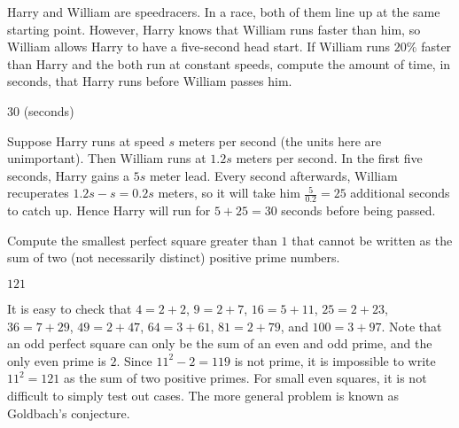 \documentclass[11pt]{article}
\begin{document}
\begin{problem}%
Harry and William are speedracers. In a race, both of them line up at the same starting point.
However, Harry knows that William runs faster than him, so William allows Harry to have
a five-second head start. If William runs $20\%$ faster than Harry and the both run at
constant speeds, compute the amount of time, in seconds, that Harry runs before William passes him.
\end{problem}

\begin{answer}
$\boxed{30}$ (seconds)
\end{answer}

\begin{solution}
Suppose Harry runs at speed $s$ meters per second (the units here are unimportant). Then William
runs at $1.2s$ meters per second. In the first five seconds, Harry gains a $5s$ meter lead.
Every second afterwards, William recuperates $1.2s - s = 0.2s$ meters, so it will take
him $\frac{5}{0.2} = 25$ additional seconds to catch up. Hence Harry will run for $5 + 25 = \boxed{30}$
seconds before being passed.
\end{solution}


\begin{problem}%
Compute the smallest perfect square greater than $1$ that cannot be written as the sum of two
(not necessarily distinct) positive prime numbers.
\end{problem}

\begin{answer}
$\boxed{121}$
\end{answer}

\begin{solution}
It is easy to check that $4 = 2+2$, $9 = 2+7$, $16 = 5+11$, $25 = 2+23$, $36 = 7+29$, $49 = 2+47$,
$64 = 3+61$, $81 = 2+79$, and $100 = 3+97$. Note that an odd perfect square can only be the
sum of an even and odd prime, and the only even prime is $2$. Since $11^2 - 2 = 119$ is not prime,
it is impossible to write $11^2 = \boxed{121}$ as the sum of two positive primes.
For small even squares, it is not difficult to simply test out cases. The more general problem
is known as Goldbach's conjecture.
\end{solution}
\end{document}
